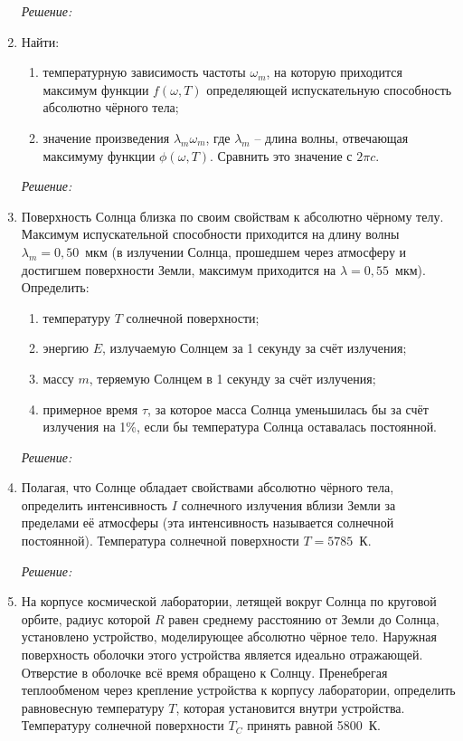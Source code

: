 \begin{enumerate}
\emph{Решение:}

\newpage

\item Найти:
\begin{enumerate}
    \item температурную зависимость частоты \( \omega_m \), на которую
    приходится максимум функции \( f(\omega, T) \) определяющей испускательную
    способность абсолютно чёрного тела;
    \item значение произведения \( \lambda_m\omega_m \),  где \( \lambda_m \) --
    длина волны, отвечающая максимуму функции \( \phi(\omega, T) \). Сравнить
    это значение с \( 2\pi c \).
\end{enumerate}

\emph{Решение:}

\newpage

\item Поверхность Солнца близка по своим свойствам к абсолютно чёрному телу.
Максимум испускательной способности приходится на длину волны \( \lambda_m =
0,\!50 \)~мкм (в излучении Солнца, прошедшем через атмосферу и достигшем
поверхности Земли, максимум приходится на \( \lambda = 0,\!55 \)~мкм).
Определить:
\begin{enumerate}
    \item температуру \( T \) солнечной поверхности;
    \item энергию \( E \), излучаемую Солнцем за 1 секунду за счёт излучения;
    \item массу \( m \), теряемую Солнцем в 1 секунду за счёт излучения;
    \item примерное время \( \tau \), за которое масса Солнца уменьшилась бы за
    счёт излучения на 1\%, если бы температура Солнца оставалась постоянной.
\end{enumerate}

\emph{Решение:}

\newpage

\item Полагая, что Солнце обладает свойствами абсолютно чёрного тела,
определить интенсивность \( I \) солнечного излучения вблизи Земли за пределами
её атмосферы (эта интенсивность называется солнечной постоянной). Температура
солнечной поверхности \( T =5785 \)~К.

\emph{Решение:}

\newpage

\item На корпусе космической лаборатории, летящей вокруг Солнца по круговой
орбите, радиус которой \( R \) равен среднему расстоянию от Земли до Солнца,
установлено устройство, моделирующее абсолютно чёрное тело. Наружная поверхность
оболочки этого устройства является идеально отражающей. Отверстие в оболочке всё
время обращено к Солнцу. Пренебрегая теплообменом через крепление устройства к
корпусу лаборатории, определить равновесную температуру \( T \), которая установится
внутри устройства. Температуру солнечной поверхности \( T_C \) принять равной 5800~К.


\end{enumerate}
